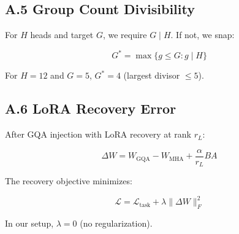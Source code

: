 \subsection{A.5 Group Count Divisibility}

For $H$ heads and target $G$, we require $G \mid H$. If not, we snap:

\[
G^* = \max\{g \le G : g \mid H\}
\tag{A.13}
\]

For $H = 12$ and $G = 5$, $G^* = 4$ (largest divisor $\le 5$).

\subsection{A.6 LoRA Recovery Error}

After GQA injection with LoRA recovery at rank $r_L$:

\[
\Delta W = W_\text{GQA} - W_\text{MHA} + \frac{\alpha}{r_L} B A
\tag{A.14}
\]

The recovery objective minimizes:

\[
\mathcal{L} = \mathcal{L}_\text{task} + \lambda \|\Delta W\|_F^2
\tag{A.15}
\]

In our setup, $\lambda = 0$ (no regularization).